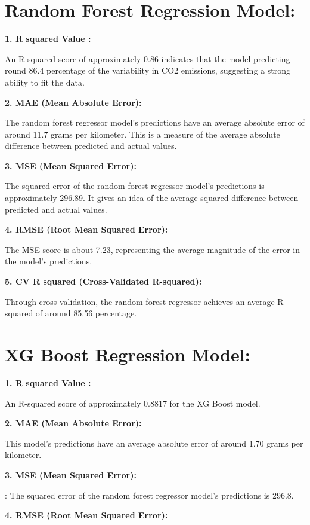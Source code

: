 \documentclass[12pt, a4paper,oneside]{book}
\numberwithin{equation}{section}
\begin{document}
\section{Random Forest Regression Model:}

\textbf{1. R squared Value :}

An R-squared score of approximately 0.86 indicates that the model predicting round 86.4 percentage of the variability in CO2 emissions, suggesting a strong ability to fit the data.

\textbf{2. MAE (Mean Absolute Error):}

The random forest regressor model's predictions have an average absolute error of around 11.7 grams per kilometer. This is a measure of the average absolute difference between predicted and actual values.

\textbf{3. MSE (Mean Squared Error):}

The squared error of the random forest regressor model's predictions is approximately 296.89. It gives an idea of the average squared difference between predicted and actual values.

\textbf{4. RMSE (Root Mean Squared Error):}

The  MSE score is about 7.23, representing the average magnitude of the error in the model's predictions.

\newpage
\textbf{5. CV R squared (Cross-Validated R-squared):} 

Through cross-validation, the random forest regressor achieves an average R-squared of around 85.56 percentage.



\section{XG Boost Regression Model:}

\textbf{1. R squared Value :}

An R-squared score of approximately 0.8817 for the XG Boost model.

\textbf{2. MAE (Mean Absolute Error):}

This model's predictions have an average absolute error of around 1.70 grams per kilometer. 

\textbf{3. MSE (Mean Squared Error):}

: The squared error of the random forest regressor model's predictions is 296.8. 

\textbf{4. RMSE (Root Mean Squared Error):}
\end{document}
